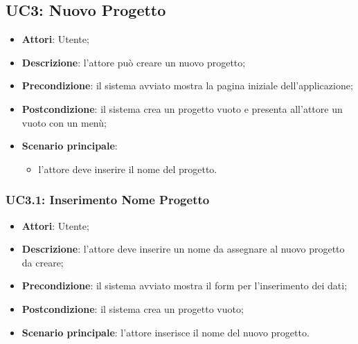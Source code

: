 \subsection{UC3: Nuovo Progetto}
\label{UC3}
\begin{itemize}
	\item \textbf{Attori}: Utente;
	\item \textbf{Descrizione}: l'attore può creare un nuovo progetto;
	\item \textbf{Precondizione}: il sistema avviato mostra la pagina iniziale dell'applicazione;
	\item \textbf{Postcondizione}: il sistema crea un progetto vuoto e presenta all'attore un  vuoto con un menù;
	\item \textbf{Scenario principale}:
	\begin{itemize} %
		\item l'attore deve inserire il nome del progetto.
	\end{itemize}
\end{itemize}

\subsubsection{UC3.1: Inserimento Nome Progetto}
\label{UC3.1}
\begin{itemize}
	\item \textbf{Attori}: Utente;
	\item \textbf{Descrizione}: l'attore deve inserire un nome da assegnare al nuovo progetto da creare;
	\item \textbf{Precondizione}: il sistema avviato mostra il form per l'inserimento dei dati;
	\item \textbf{Postcondizione}: il sistema crea un progetto vuoto;
	\item \textbf{Scenario principale}: l'attore inserisce il nome del nuovo progetto.
\end{itemize}

